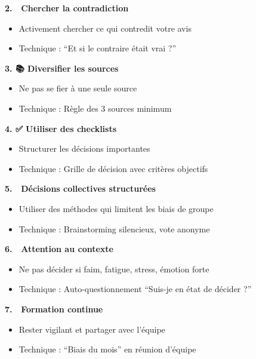 \documentclass[
]{article}
\providecommand{\tightlist}{%
  \setlength{\itemsep}{0pt}\setlength{\parskip}{0pt}}
\begin{document}
\textbf{2. 🔄 Chercher la contradiction}

\begin{itemize}
\tightlist
\item
  Activement chercher ce qui contredit votre avis
\item
  Technique : ``Et si le contraire était vrai ?''
\end{itemize}

\textbf{3. 📚 Diversifier les sources}

\begin{itemize}
\tightlist
\item
  Ne pas se fier à une seule source
\item
  Technique : Règle des 3 sources minimum
\end{itemize}

\textbf{4. ✅ Utiliser des checklists}

\begin{itemize}
\tightlist
\item
  Structurer les décisions importantes
\item
  Technique : Grille de décision avec critères objectifs
\end{itemize}

\textbf{5. 👥 Décisions collectives structurées}

\begin{itemize}
\tightlist
\item
  Utiliser des méthodes qui limitent les biais de groupe
\item
  Technique : Brainstorming silencieux, vote anonyme
\end{itemize}

\textbf{6. 🧘 Attention au contexte}

\begin{itemize}
\tightlist
\item
  Ne pas décider si faim, fatigue, stress, émotion forte
\item
  Technique : Auto-questionnement ``Suis-je en état de décider ?''
\end{itemize}

\textbf{7. 📖 Formation continue}

\begin{itemize}
\tightlist
\item
  Rester vigilant et partager avec l'équipe
\item
  Technique : ``Biais du mois'' en réunion d'équipe
\end{itemize}
\end{document}
